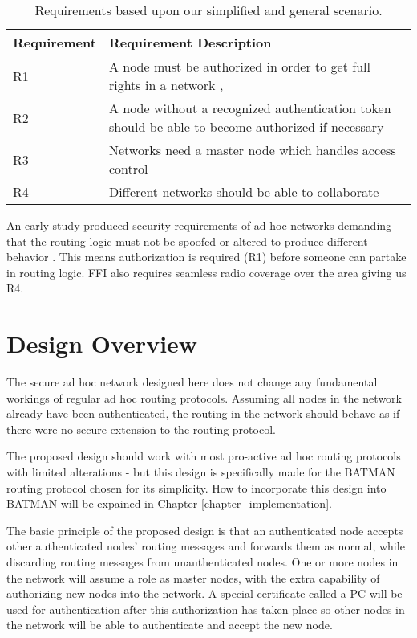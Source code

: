 \begin{table}[ht!]
	\centering
	\begin{tabular}{ | l | p{11cm} | }
	\hline
	\textbf{Requirement} & \textbf{Requirement Description}\\\hline
		R1 & A node must be authorized in order to get full rights in a
		network \cite{dahill2001secure}, \cite{sanzgiri2002secure}\\\hline
		R2 & A node without a recognized authentication token should be able to become
		authorized if necessary\\ \hline
		R3 & Networks need a master node which handles access control\\\hline
		R4 & Different networks should be able to collaborate
		\cite{ffi_2005_04015}\\\hline
	\end{tabular}
	\caption{Requirements based upon our simplified and general scenario.}
	\label{tab:our_req}
\end{table}

An early study produced security requirements of ad hoc networks demanding
that the routing logic must not be spoofed or altered to produce different
behavior \cite{dahill2001secure}. This means authorization is required (R1)
before someone can partake in routing logic. FFI also requires seamless radio coverage over the
area giving us R4.

\section{Design Overview}
The secure ad hoc network designed here does not change any fundamental workings
of regular ad hoc routing protocols. Assuming all nodes in the network already
have been authenticated, the routing in the network should behave as if there
were no secure extension to the routing protocol.

The proposed design should work with most pro-active ad hoc routing protocols
with limited alterations - but this design is specifically made for the BATMAN routing
protocol chosen for its simplicity. How to incorporate this design into BATMAN
will be expained in Chapter \ref{chapter_implementation}.

The basic principle of the proposed design is that an authenticated node accepts
other authenticated nodes' routing messages and forwards them as normal, while
discarding routing messages from unauthenticated nodes. One or more nodes in the
network will assume a role as master nodes, with the extra capability of
authorizing new nodes into the network. A special certificate called a \ac{PC}
will be used for authentication after this authorization has taken place so
other nodes in the network will be able to authenticate and accept the new
node.


